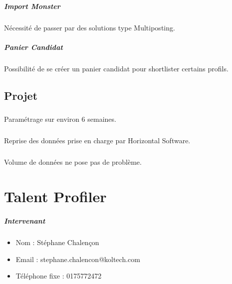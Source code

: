 \documentclass[12pt,twoside]{scrreprt}
\begin{document}
\paragraph{Import Monster} Nécessité de passer par des solutions type Multiposting.
\paragraph{Panier Candidat} Possibilité de se créer un panier candidat pour shortlister certains profils.

\section{Projet}
\paragraph{} Paramétrage sur environ 6 semaines.
\paragraph{} Reprise des données prise en charge par Horizontal Software.
\paragraph{} Volume de données ne pose pas de problème.




\chapter{Talent Profiler}


\paragraph{Intervenant}
\begin{itemize}
	\item Nom : Stéphane Chalençon
	\item Email : stephane.chalencon@koltech.com
	\item Téléphone fixe : 0175772472  
\end{itemize}
\end{document}

